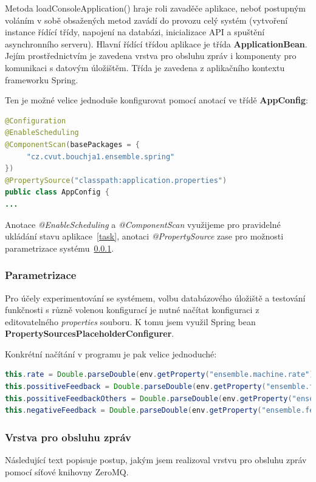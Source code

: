 \documentclass[thesis=M,czech]{FITthesis}[2014/05/07]
\begin{document}
Metoda loadConsoleApplication() hraje roli zavaděče aplikace, neboť postupným voláním v sobě obsažených metod zavádí do provozu celý systém (vytvoření instance řídící třídy, napojení na databázi, inicializace API a spuštění asynchronního serveru). Hlavní řídící třídou aplikace je třída \textbf{ApplicationBean}. Jejím prostřednictvím je zavedena vrstva pro obsluhu zpráv i komponenty pro komunikaci s datovým úložištěm. Třída je zavedena z aplikačního kontextu frameworku Spring.

Ten je možné velice jednoduše konfigurovat pomocí anotací ve třídě \textbf{AppConfig}:

\begin{lstlisting}[language=java]
@Configuration
@EnableScheduling
@ComponentScan(basePackages = {
     "cz.cvut.bouchja1.ensemble.spring"
})
@PropertySource("classpath:application.properties")
public class AppConfig {
...
\end{lstlisting}

Anotace \emph{@EnableScheduling} a \emph{@ComponentScan} využijeme pro pravidelné ukládání stavu aplikace~\ref{task}, anotaci \emph{@PropertySource} zase pro možnosti parametrizace systému~\ref{param}.

\subsubsection{Parametrizace}
\label{param}
Pro účely experimentování se systémem, volbu databázového úložiště a testování funkčnosti s různě volenou konfigurací je nutné načítat konfiguraci z editovatelného \emph{properties} souboru. K tomu jsem využil Spring bean \textbf{PropertySourcesPlaceholderConfigurer}.

Konkrétní načítání v programu je pak velice jednoduché:

\begin{lstlisting}[language=java]
this.rate = Double.parseDouble(env.getProperty("ensemble.machine.rate"));
this.possitiveFeedback = Double.parseDouble(env.getProperty("ensemble.feedback.possitive.winner"));
this.possitiveFeedbackOthers = Double.parseDouble(env.getProperty("ensemble.feedback.possitive.losers"));
this.negativeFeedback = Double.parseDouble(env.getProperty("ensemble.feedback.negative.stupid"));
\end{lstlisting}

\subsubsection{Vrstva pro obsluhu zpráv}
\label{sub:messvrs}
Následující text popisuje postup, jakým jsem realizoval vrstvu pro obsluhu zpráv pomocí síťové knihovny ZeroMQ.
\end{document}
